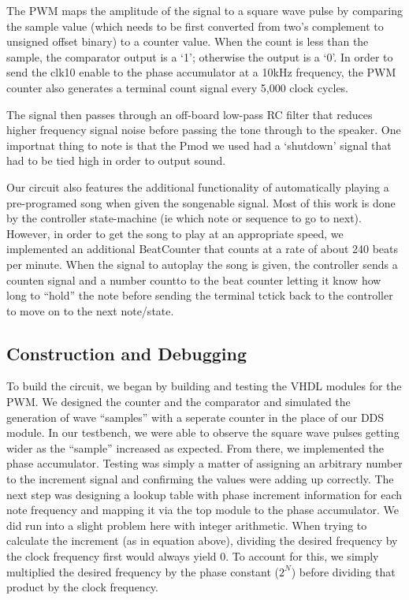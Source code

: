 \documentclass{article}
\begin{document}
    The PWM maps the amplitude of the signal to a square wave pulse by comparing the sample value (which needs to be first converted from two's complement to unsigned offset binary) to a counter value. When the count is less than the sample, the comparator output is a `1'; otherwise the output is a `0'. In order to send the clk10 enable to the phase accumulator at a 10kHz frequency, the PWM counter also generates a terminal count signal every 5,000 clock cycles. 

    The signal then passes through an off-board low-pass RC filter that reduces higher frequency signal noise before passing the tone through to the speaker. One importnat thing to note is that the Pmod we used had a `shutdown' signal that had to be tied high in order to output sound.

    Our circuit also features the additional functionality of automatically playing a pre-programed song when given the song\textunderscore enable signal. Most of this work is done by the controller state-machine (ie which note or sequence to go to next). However, in order to get the song to play at an appropriate speed, we implemented an additional BeatCounter that counts at a rate of about 240 beats per minute. When the signal to autoplay the song is given, the controller sends a count\textunderscore en signal and a number count\textunderscore to to the beat counter letting it know how long to ``hold'' the note before sending the terminal tc\textunderscore tick back to the controller to move on to the next note/state.

  \subsection{Construction and Debugging}


    To build the circuit, we began by building and testing the VHDL modules for the PWM. We designed the counter and the comparator and simulated the generation of wave ``samples'' with a seperate counter in the place of our DDS module. In our testbench, we were able to observe the square wave pulses getting wider as the ``sample'' increased as expected. From there, we implemented the phase accumulator. Testing was simply a matter of assigning an arbitrary number to the increment signal and confirming the values were adding up correctly. The next step was designing a lookup table with phase increment information for each note frequency and mapping it via the top module to the phase accumulator. We did run into a slight problem here with integer arithmetic. When trying to calculate the increment (as in equation above), dividing the desired frequency by the clock frequency first would always yield 0. To account for this, we simply multiplied the desired frequency by the phase constant ($2^N$) before dividing that product by the clock frequency.
\end{document}
